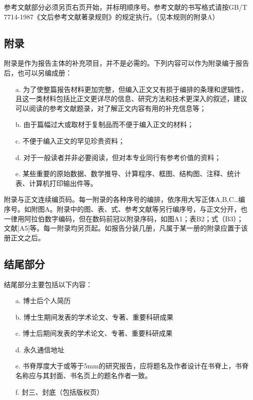 参考文献部分必须另页右页开始，并标明顺序号。参考文献的书写格式请按GB/T 7714-1987《文后参考文献著录规则》的规定执行。（见本规则的附录A）

\subsection{附录}

附录是作为报告主体的补充项目，并不是必需的。下列内容可以作为附录编于报告后，也可以另编成册：

\begin{itemize}[leftmargin=2em]
    \item[a.] 为了使整篇报告材料更加完整，但编入正文又有损于编排的条理和逻辑性，且这一类材料包括比正文更详尽的信息、研究方法和技术更深入的叙述，建议可以阅读的参考文献题录，对了解正文内容有用的补充信息等；
    \item[b.] 由于篇幅过大或取材于复制品而不便于编入正文的材料；
    \item[c.] 不便于编入正文的罕见珍贵资料；
    \item[d.] 对于一般读者并非必要阅读，但对本专业同行有参考价值的资料；
    \item[e.] 某些重要的原始数据、数学推导、计算程序、框图、结构图、注释、统计表、计算机打印输出件等。
\end{itemize}

附录与正文连续编页码。每一附录的各种序号的编排，依序用大写正体A,B,C…编序号。如附图A。附录中的图、表、式、参考文献等另行编序号，与正文分开，也一律用阿拉伯数字编码，但在数码前冠以附录序码，如图A1；表B2；式（B3）；文献[A5]等。每一附录均另页起。如报告分装几册，凡属于某一册的附录应置于该册正文之后。

\subsection{结尾部分}

结尾部分主要包括以下内容：

\begin{itemize}[leftmargin=2em]
    \item[a.] 博士后个人简历
    \item[b.] 博士生期间发表的学术论文、专著、重要科研成果
    \item[c.] 博士后期间发表的学术论文、专著、重要科研成果
    \item[d.] 永久通信地址
    \item[e.] 书脊厚度大于或等于5mm的研究报告，应将题名及作者设计在书脊上，书脊名称应与其封面、书名页上的题名作者一致。
    \item[f.] 封三、封底（包括版权页）
\end{itemize}

